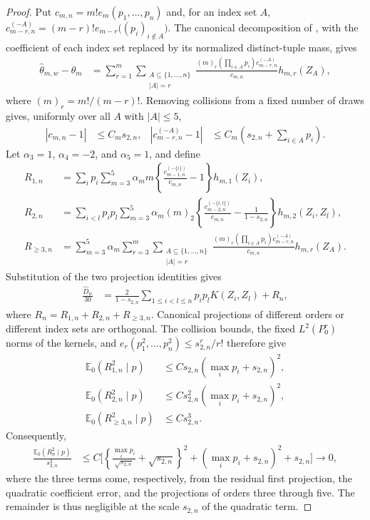 \begin{proof}
Put $c_{m,n}=m!e_m(p_1,\ldots,p_n)$ and, for an index set $A$,
$c_{m-r,n}^{(-A)}=(m-r)!e_{m-r}\bigl((p_i)_{i\notin A}\bigr)$. The canonical
decomposition of \citet{hoeffding1948u}, with the coefficient of each index
set replaced by its normalized distinct-tuple mass, gives
\begin{align*}
  \widehat\theta_{m,w}-\theta_m
  &= \sum_{r=1}^m
     \sum_{\substack{A\subseteq\{1,\ldots,n\}\\|A|=r}}
     \frac{
       (m)_r\left(\prod_{i\in A}p_i\right)
       c_{m-r,n}^{(-A)}
     }{c_{m,n}}
     h_{m,r}(Z_A),
\end{align*}
where $(m)_r=m!/(m-r)!$. Removing collisions from a fixed number of draws
gives, uniformly over all $A$ with $|A|\leq5$,
\begin{align*}
  |c_{m,n}-1|
  &\leq C_m s_{2,n},
  &
  |c_{m-r,n}^{(-A)}-1|
  &\leq C_m\left(s_{2,n}+\sum_{i\in A}p_i\right).
\end{align*}
Let $\alpha_3=1$, $\alpha_4=-2$, and $\alpha_5=1$, and define
\begin{align*}
  R_{1,n}
  &=\sum_i p_i\sum_{m=3}^5\alpha_m m
    \left\{
      \frac{c_{m-1,n}^{(-\{i\})}}{c_{m,n}}-1
    \right\}h_{m,1}(Z_i),\\
  R_{2,n}
  &=\sum_{i<l}p_ip_l\sum_{m=3}^5\alpha_m(m)_2
    \left\{
      \frac{c_{m-2,n}^{(-\{i,l\})}}{c_{m,n}}
      -\frac{1}{1-s_{2,n}}
    \right\}h_{m,2}(Z_i,Z_l),\\
  R_{\geq3,n}
  &=\sum_{m=3}^5\alpha_m
    \sum_{r=3}^m
    \sum_{\substack{A\subseteq\{1,\ldots,n\}\\|A|=r}}
    \frac{
      (m)_r\left(\prod_{i\in A}p_i\right)
      c_{m-r,n}^{(-A)}
    }{c_{m,n}}h_{m,r}(Z_A).
\end{align*}
Substitution of the two projection identities gives
\begin{align}
  \frac{\widehat D_w}{30}
  &= \frac{2}{1-s_{2,n}}
     \sum_{1\leq i<l\leq n}p_ip_lK(Z_i,Z_l)+R_n,
  \label{eq:hoeffding-quadratic-projection}
\end{align}
where $R_n=R_{1,n}+R_{2,n}+R_{\geq3,n}$. Canonical projections of different
orders or different index sets are orthogonal. The collision bounds, the
fixed $L^2(P_0^r)$ norms of the kernels, and
$e_r(p_1^2,\ldots,p_n^2)\leq s_{2,n}^r/r!$ therefore give
\begin{align*}
  \mathbb{E}_0(R_{1,n}^2\mid p)
  &\leq C s_{2,n}(\max_i p_i+s_{2,n})^2,\\
  \mathbb{E}_0(R_{2,n}^2\mid p)
  &\leq C s_{2,n}^2(\max_i p_i+s_{2,n})^2,\\
  \mathbb{E}_0(R_{\geq3,n}^2\mid p)
  &\leq C s_{2,n}^3.
\end{align*}
Consequently,
\begin{align*}
  \frac{\mathbb{E}_0(R_n^2\mid p)}{s_{2,n}^2}
  &\leq C\Biggl[
    \left\{
      \frac{\max_i p_i}{\sqrt{s_{2,n}}}+\sqrt{s_{2,n}}
    \right\}^2
    +(\max_i p_i+s_{2,n})^2+s_{2,n}
  \Biggr]
  \longrightarrow0,
\end{align*}
where the three terms come, respectively, from the residual first
projection, the quadratic coefficient error, and the projections of orders
three through five. The remainder is thus negligible at the scale $s_{2,n}$
of the quadratic term.


\end{proof}
